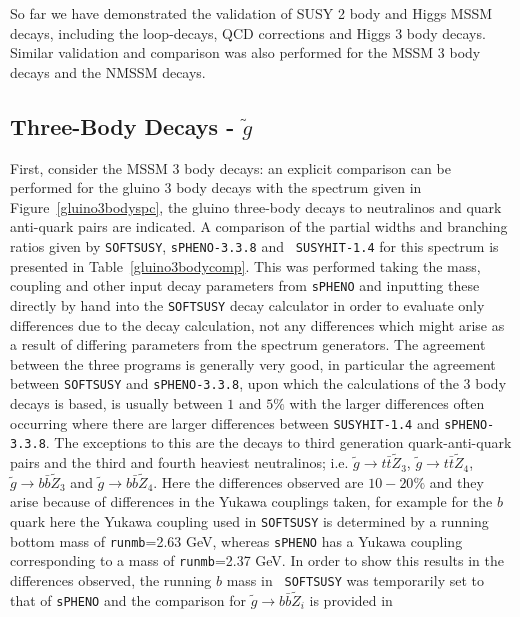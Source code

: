 \documentclass[final,3p,times]{elsarticle}
\def\code#1{{\tt #1}}
\begin{document}
So far we have demonstrated the validation of SUSY 2 body and Higgs MSSM
decays, including the loop-decays, QCD corrections and Higgs 3 body
decays. Similar validation and comparison was also performed for the MSSM
3 body decays and the NMSSM decays. 


\subsection{Three-Body Decays - $\tilde{g}$} \label{glu3bodysec}

First, consider the MSSM 3 body decays: an explicit comparison can be
performed for the gluino 3 body decays with the spectrum given in
Figure~\ref{gluino3bodyspc}, the gluino three-body decays to neutralinos and
quark anti-quark pairs are indicated. A comparison of the partial widths and
branching ratios given by {\tt SOFTSUSY}, {\tt sPHENO-3.3.8} and {\tt
  SUSYHIT-1.4} for 
this spectrum is presented in Table~\ref{gluino3bodycomp}. This was performed
taking the mass, coupling and other input decay parameters from {\tt sPHENO}
and inputting these directly by hand 
into the {\tt SOFTSUSY} decay calculator in order to evaluate only differences
due to 
the decay calculation, not any differences which might arise as a result of
differing parameters from the spectrum generators. The agreement
between the three programs is generally very good, in particular the agreement
between {\tt SOFTSUSY} and {\tt sPHENO-3.3.8}, upon which the calculations of
the 3 body decays is based, is usually between $1$ and $5\%$ with the
larger differences often occurring where there are larger differences between
{\tt SUSYHIT-1.4} and {\tt sPHENO-3.3.8}. The exceptions to this are the
decays to third generation quark-anti-quark pairs and the third and fourth
heaviest neutralinos; i.e. $\tilde{g} \rightarrow t \bar{t} \tilde{Z}_{3}$,
$\tilde{g} \rightarrow t \bar{t} \tilde{Z}_{4}$, $\tilde{g} \rightarrow b
\bar{b} \tilde{Z}_{3}$ and $\tilde{g} \rightarrow b \bar{b}
\tilde{Z}_{4}$. Here the differences observed are $10-20\%$ and they arise
because of differences in the Yukawa couplings taken, for example for the $b$
quark here the Yukawa coupling used in {\tt SOFTSUSY} is determined by a
running bottom mass of \code{runmb}=2.63 GeV, whereas {\tt sPHENO} has a
Yukawa coupling corresponding to a mass of \code{runmb}=2.37 GeV. In order to
show this results in the differences observed, the running $b$ mass in {\tt
  SOFTSUSY} was temporarily set to that of {\tt sPHENO} and the comparison for
$\tilde{g} \rightarrow b \bar{b} \tilde{Z}_i$ is provided in
\end{document}
